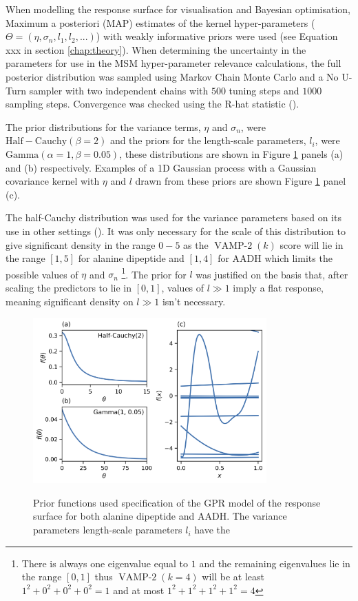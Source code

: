 When modelling the response surface for visualisation and Bayesian optimisation, Maximum a posteriori (MAP) estimates  of the kernel hyper-parameters ($\Theta = (\eta, \sigma_{n}, l_{1}, l_{2}, ...)$) with weakly informative priors were used (see Equation xxx in section \ref{chap:theory}). When determining the uncertainty in the parameters for use in the MSM hyper-parameter relevance calculations, the full posterior distribution was sampled using Markov Chain Monte Carlo and a No U-Turn sampler with two independent chains with $500$ tuning steps and $1000$ sampling steps. Convergence was checked using the R-hat statistic (\cite{gelmanBayesianDataAnalysis2014}). 

The prior distributions for the variance terms, $\eta$ and $\sigma_{n}$, were $\mathrm{Half-Cauchy}(\beta=2)$ and the priors for the length-scale parameters, $l_{i}$, were $\mathrm{Gamma}(\alpha=1, \beta=0.05)$, these distributions are shown in Figure \ref{fig:priors} panels (a) and (b) respectively.  Examples of a 1D Gaussian process with a Gaussian covariance kernel with $\eta$ and $l$ drawn from these priors are shown Figure \ref{fig:priors} panel (c).  

The half-Cauchy distribution  was used for the variance parameters  based on its use in other settings (\cite{polsonHalfCauchyPriorGlobal2012}). It was  only necessary for the scale of this distribution to give significant density in the range $0-5$ as the $\operatorname{VAMP-2}(k)$ score will lie in the range $[1,5]$ for alanine dipeptide and $[1, 4]$ for AADH which limits the possible values of $\eta$ and $\sigma_{n}$ \footnote{There is always one eigenvalue equal to $1$ and the remaining eigenvalues lie in the range $[0, 1]$ thus $\operatorname{VAMP-2}(k=4)$ will be at least $1^2 + 0^2 + 0^2 + 0^2=1$ and at most $1^2 + 1^2 + 1^2 + 1^2=4$}. The prior for $l$ was justified on the basis that, after scaling the predictors to lie in $[0, 1]$, values of $l \gg 1$ imply a flat response, meaning significant density on $l \gg 1$ isn't necessary. 

\begin{figure}
    \centering
    \caption{Prior functions used specification of the GPR model of the response surface for both alanine dipeptide and AADH. The variance parameters  length-scale parameters $l_{i}$ have the }
    \includegraphics[width=0.8\textwidth]{chapters/msm_optimization/figures/prior_functions.png}
    \label{fig:priors}
\end{figure}

